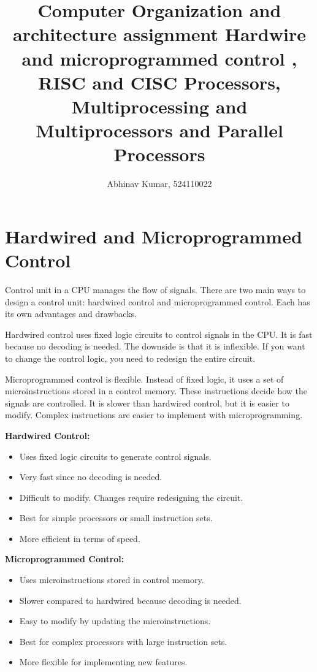 \documentclass[12pt]{article}
\title{Computer Organization and architecture assignment Hardwire and microprogrammed control , RISC and CISC Processors, Multiprocessing and Multiprocessors and Parallel Processors}
\author{Abhinav Kumar, 524110022}
\begin{document}
\maketitle
\newpage
\section*{Hardwired and Microprogrammed Control}
Control unit in a CPU manages the flow of signals. There are two main ways to design a control unit: hardwired control and microprogrammed control. Each has its own advantages and drawbacks. 

Hardwired control uses fixed logic circuits to control signals in the CPU. It is fast because no decoding is needed. The downside is that it is inflexible. If you want to change the control logic, you need to redesign the entire circuit.

Microprogrammed control is flexible. Instead of fixed logic, it uses a set of microinstructions stored in a control memory. These instructions decide how the signals are controlled. It is slower than hardwired control, but it is easier to modify. Complex instructions are easier to implement with microprogramming.


\begin{multicols}{2}
    \textbf{Hardwired Control:}
    \begin{itemize}
        \item Uses fixed logic circuits to generate control signals.
        \item Very fast since no decoding is needed.
        \item Difficult to modify. Changes require redesigning the circuit.
        \item Best for simple processors or small instruction sets.
        \item More efficient in terms of speed.
    \end{itemize}
    
    \columnbreak
    
    \textbf{Microprogrammed Control:}
    \begin{itemize}
        \item Uses microinstructions stored in control memory.
        \item Slower compared to hardwired because decoding is needed.
        \item Easy to modify by updating the microinstructions.
        \item Best for complex processors with large instruction sets.
        \item More flexible for implementing new features.
    \end{itemize}
\end{multicols}
\newpage
\end{document}
